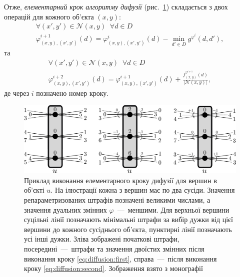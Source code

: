 Отже, \textit{елементарний крок алгоритму дифузії}
(рис.~\ref{fig:diffusion:step})
складається з двох операцій для кожного об'єкта $\left(x, y \right)$:
\begin{equation}\label{eq:diffusion:first}
\begin{gathered}
    \forall \left( x', y' \right) \in \mathcal{N} \left(x, y\right) \; \;
    \forall d \in D \\
    \varphi_{\left(x, y \right), \left(x', y' \right)}^{i + 1} \left( d \right)
    = \varphi_{\left(x, y \right), \left(x', y' \right)}^i \left( d \right)
    - \min \limits_{d' \in D}
        g^{\varphi^i} \left(d, d' \right),
\end{gathered}
\end{equation}
та
\begin{equation}\label{eq:diffusion:second}
\begin{gathered}
    \forall \left( x', y' \right) \in \mathcal{N} \left(x, y\right) \; \;
    \forall d \in D \\
    \varphi_{\left(x, y \right), \left(x', y' \right)}^{i + 2} \left( d \right)
    = \varphi_{\left(x, y \right), \left(x', y' \right)}^{i + 1} \left( d \right)
    + \frac{f_{\left(x, y \right)}^{\varphi^{i + 1}} \left(d \right)}{\left| \mathcal{N} \left(x, y \right)\right|},
\end{gathered}
\end{equation}
де через $i$ позначено номер кроку.

\begin{figure}[h]
  \centering
  \includegraphics[width=\textwidth]{images/diffusion_step}
  \caption{Приклад виконання елементарного кроку дифузії для вершин в об'єкті $u$.
           На ілюстрації кожна з вершин має по два сусіди.
           Значення репараметризованих штрафів позначені великими числами,
           а значення дуальних змінних $\varphi$~---~меншими.
           Для верхньої вершини суцільні лінії позначають мінімальні штрафи
           за вибір дужки від цієї вершини до кожного сусіднього об'єкта,
           пунктирні лінії позначають усі інші дужки.
           Зліва зображені початкові штрафи,
           посередині~---~штрафи та значення
           двоїстих змінних після виконання кроку \eqref{eq:diffusion:first},
           справа~---~після виконання кроку \eqref{eq:diffusion:second}.
           Зображення взято з монографії \cite{overview:savchynskyy:diffusion}}
  \label{fig:diffusion:step}
\end{figure}


